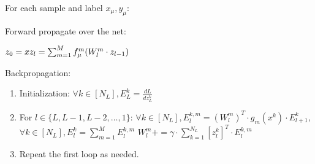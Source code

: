 \begin{mdframed}[backgroundcolor=green_background, linecolor=black, linewidth=2pt, frametitle=\textbf{Pseudo-code}]

For each sample and label \(x_\mu, y_\mu\):

Forward propagate over the net:

\(z_0 = x \\ z_l = \sum_{m=1}^M f_\mu^m(W_l^m \cdot z_{l-1})\)

Backpropagation:

\begin{enumerate}
    \item Initialization:
    \(\forall k \in [N_L], E_L^k = \frac{dL}{dz_L^k}\)

    \item For \(l \in \{L, L-1, L-2, \ldots, 1\}\):
    \(\forall k \in [N_L], E_l^{k,m} = (W_l^m)^T \cdot g_m(x^k) \cdot E_{l+1}^k\), \(\forall k \in [N_L], E_l^k = \sum_{m=1}^M E_l^{k,m}\)
    \(W_l^m += \gamma \cdot \sum_{k=1}^{N_L} [z_l^k]^T \cdot E_l^{k,m}\)

    \item Repeat the first loop as needed.
    
\end{enumerate}

\end{mdframed}

